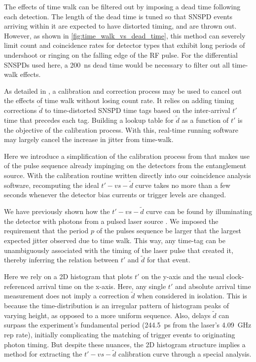 \documentclass[11pt]{caltech_thesis} %
\begin{document}
The effects of time walk can be filtered out by imposing a dead time following each detection. The length of the dead time is tuned so that SNSPD events arriving within it are expected to have distorted timing, and are thrown out. However, as shown in \ref{fig:time_walk_vs_dead_time}, this method can severely limit count and coincidence rates for detector types that exhibit long periods of undershoot or ringing on the falling edge of the RF pulse. For the differential SNSPDs used here, a 200~ns dead time would be necessary to filter out all time-walk effects.

As detailed in \autocite{Mueller2023,Craiciu23}, a calibration and correction process may be used to cancel out the effects of time walk without losing count rate. It relies on adding timing corrections $\tilde{d}$ to time-distorted SNSPD time tags based on the inter-arrival $t'$ time that precedes each tag. Building a lookup table for $\tilde{d}$ as a function of $t'$ is the objective of the calibration process. With this, real-time running software may largely cancel the increase in jitter from time-walk.

Here we introduce a simplification of the calibration process from \autocite{Mueller2023} that makes use of the pulse sequence already impinging on the detectors from the entanglement source. With the calibration routine written directly into our coincidence analysis software, recomputing the ideal $t'-vs-\tilde{d}$ curve takes no more than a few seconds whenever the detector bias currents or trigger levels are changed.

We have previously shown how the $t'-vs-\tilde{d}$ curve can be found by illuminating the detector with photons from a pulsed laser source \autocite{Mueller2023}. We imposed the requirement that the period $p$ of the pulses sequence be larger that the largest expected jitter observed due to time walk. This way, any time-tag can be unambiguously associated with the timing of the laser pulse that created it, thereby inferring the relation between $t'$ and $\tilde{d}$ for that event.

Here we rely on a 2D histogram that plots $t'$ on the y-axis and the usual clock-referenced arrival time on the x-axis. Here, any single $t'$ and absolute arrival time measurement does not imply a correction $\tilde{d}$ when considered in isolation. This is because the time-distribution is an irregular pattern of histogram peaks of varying height, as opposed to a more uniform sequence. Also, delays $\tilde{d}$ can surpass the experiment's fundamental period (244.5~ps from the laser's 4.09~GHz rep rate), initially complicating the matching of trigger events to originating photon timing. But despite these nuances, the 2D histogram structure implies a method for extracting the $t'-vs-\tilde{d}$ calibration curve through a special analysis.
\end{document}
